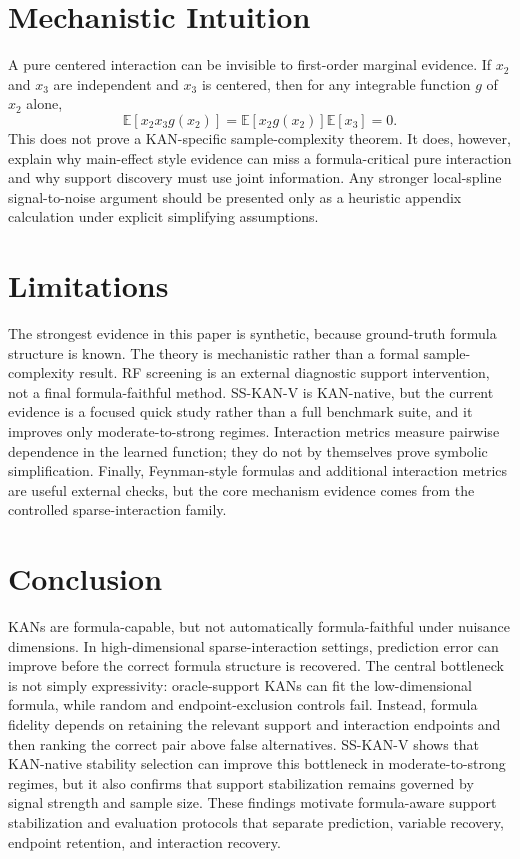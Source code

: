 \documentclass[11pt]{article}
\begin{document}
\section{Mechanistic Intuition}

A pure centered interaction can be invisible to first-order marginal evidence. If $x_2$ and $x_3$ are independent and $x_3$ is centered, then for any integrable function $g$ of $x_2$ alone,
\begin{equation}
    \mathbb{E}\left[x_2 x_3 g(x_2)\right]
    =
    \mathbb{E}\left[x_2 g(x_2)\right]\mathbb{E}[x_3]
    =
    0.
\end{equation}
This does not prove a KAN-specific sample-complexity theorem. It does, however, explain why main-effect style evidence can miss a formula-critical pure interaction and why support discovery must use joint information. Any stronger local-spline signal-to-noise argument should be presented only as a heuristic appendix calculation under explicit simplifying assumptions.

\section{Limitations}

The strongest evidence in this paper is synthetic, because ground-truth formula structure is known. The theory is mechanistic rather than a formal sample-complexity result. RF screening is an external diagnostic support intervention, not a final formula-faithful method. SS-KAN-V is KAN-native, but the current evidence is a focused quick study rather than a full benchmark suite, and it improves only moderate-to-strong regimes. Interaction metrics measure pairwise dependence in the learned function; they do not by themselves prove symbolic simplification. Finally, Feynman-style formulas and additional interaction metrics are useful external checks, but the core mechanism evidence comes from the controlled sparse-interaction family.

\section{Conclusion}

KANs are formula-capable, but not automatically formula-faithful under nuisance dimensions. In high-dimensional sparse-interaction settings, prediction error can improve before the correct formula structure is recovered. The central bottleneck is not simply expressivity: oracle-support KANs can fit the low-dimensional formula, while random and endpoint-exclusion controls fail. Instead, formula fidelity depends on retaining the relevant support and interaction endpoints and then ranking the correct pair above false alternatives. SS-KAN-V shows that KAN-native stability selection can improve this bottleneck in moderate-to-strong regimes, but it also confirms that support stabilization remains governed by signal strength and sample size. These findings motivate formula-aware support stabilization and evaluation protocols that separate prediction, variable recovery, endpoint retention, and interaction recovery.
\end{document}

